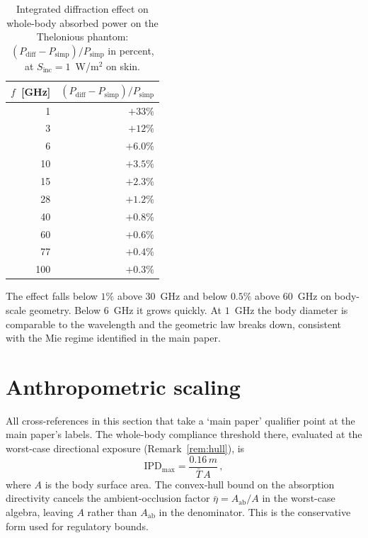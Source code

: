 \documentclass[journal,twocolumn,10pt]{IEEEtran}
\theoremstyle{plain}
\theoremstyle{remark}
\newcommand{\IPD}{\mathrm{IPD}}
\newcommand{\Aab}{A_{\mathrm{ab}}}
\newcommand{\Tbar}{\bar{T}}
\begin{document}
\begin{table}[!t]
\centering
\caption{Integrated diffraction effect on whole-body absorbed power
on the Thelonious phantom: $(P_{\mathrm{diff}} -
P_{\mathrm{simp}})/P_{\mathrm{simp}}$ in percent, at $S_{\mathrm{inc}}
= 1$~W/m$^2$ on skin.}
\label{tab:si-diffraction}
\begin{tabular}{rr}
\toprule
$f$~[GHz] & $(P_{\mathrm{diff}}-P_{\mathrm{simp}})/P_{\mathrm{simp}}$ \\
\midrule
1   & $+33\%$ \\
3   & $+12\%$ \\
6   & $+6.0\%$ \\
10  & $+3.5\%$ \\
15  & $+2.3\%$ \\
28  & $+1.2\%$ \\
40  & $+0.8\%$ \\
60  & $+0.6\%$ \\
77  & $+0.4\%$ \\
100 & $+0.3\%$ \\
\bottomrule
\end{tabular}
\end{table}

The effect falls below $1\%$ above $30$~GHz and below $0.5\%$ above
$60$~GHz on body-scale geometry. Below $6$~GHz it grows quickly. At
$1$~GHz the body diameter is comparable to the wavelength and the
geometric law breaks down, consistent with the Mie regime
identified in the main paper.


\section{Anthropometric scaling}\label{si:anthro}

All cross-references in this section that take a `main paper'
qualifier point at the main paper's labels. The whole-body
compliance threshold there, evaluated at the worst-case directional
exposure (Remark~\ref{rem:hull}), is
\begin{equation}\label{eq:Sinc-max-SI}
  \IPD_{\mathrm{max}} = \frac{0.16\,m}{\Tbar\,A}\, ,
\end{equation}
where $A$ is the body surface area. The convex-hull bound on the
absorption directivity cancels the ambient-occlusion factor
$\bar\eta = \Aab/A$ in the worst-case algebra, leaving $A$ rather
than $\Aab$ in the denominator. This is the conservative form used
for regulatory bounds.
\end{document}
